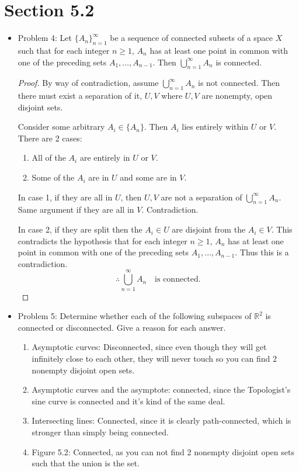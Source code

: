 \documentclass[hidelinks,12pt]{article}
\theoremstyle{definition}
\renewcommand{\skip}{\par\null\par}
\newcommand{\R}{\mathbb{R}}
\begin{document}
\section{Section 5.2}
\begin{itemize}
    \item Problem 4: Let $\{A_n\}_{n=1}^\infty$ be a sequence of connected subsets of a space $X$ such that for each integer $n\geq1$, $A_n$ has at least one point in common with one of the preceding sets $A_1,\dots,A_{n-1}$. Then $\bigcup_{n=1}^{\infty}A_n$ is connected.\begin{proof}By way of contradiction, assume $\bigcup_{n=1}^{\infty}A_n$ is not connected. Then there must exist a separation of it, $U,V$ where $U,V$ are nonempty, open disjoint sets.\skip Consider some arbitrary $A_i\in\{A_n\}$. Then $A_i$ lies entirely within $U$ or $V$. There are 2 cases:\begin{enumerate}
        \item All of the $A_i$ are entirely in $U$ or $V$.
        \item Some of the $A_i$ are in $U$ and some are in $V$.
    \end{enumerate}
    In case 1, if they are all in $U$, then $U,V$ are not a separation of $\bigcup_{n=1}^{\infty}A_n$. Same argument if they are all in $V$. Contradiction.\skip In case 2, if they are split then the $A_i\in U$ are disjoint from the $A_i\in V$. This contradicts the hypothesis that for each integer $n\geq1$, $A_n$ has at least one point in common with one of the preceding sets $A_1,\dots,A_{n-1}$. Thus this is a contradiction. $$\therefore\bigcup_{n=1}^{\infty}A_n\quad\text{is connected.}$$
    \end{proof}
    \item Problem 5: Determine whether each of the following subspaces of $\R^2$ is connected or disconnected. Give a reason for each answer.\begin{enumerate}[label=(\alph*)]
        \item Asymptotic curves: Disconnected, since even though they will get infinitely close to each other, they will never touch so you can find 2 nonempty disjoint open sets.
        \item Asymptotic curves and the asymptote: connected, since the Topologist's sine curve is connected and it's kind of the same deal.
        \item Intersecting lines: Connected, since it is clearly path-connected, which is stronger than simply being connected.
        \item Figure 5.2: Connected, as you can not find 2 nonempty disjoint open sets such that the union is the set.

\end{enumerate}
\end{itemize}
\end{document}
